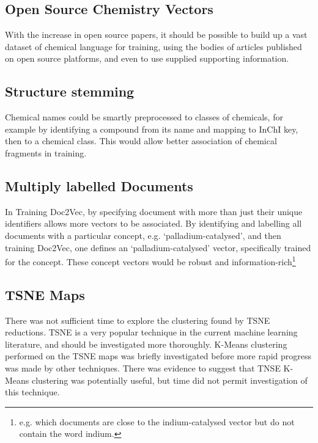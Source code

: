 \subsection{Open Source Chemistry Vectors}
With the increase in open source papers, it should be possible to build up a vast dataset of chemical language for training, using the bodies of articles published on open source platforms, and even to use supplied supporting information. 
\subsection{Structure stemming}
Chemical names could be smartly preprocessed to classes of chemicals, for example by identifying a compound from its name and mapping to InChI key, then to a chemical class. This would allow better association of chemical fragments in training.
\subsection{Multiply labelled Documents}
In Training Doc2Vec, by specifying document with more than just their unique identifiers allows more vectors to be associated. By identifying and labelling all documents with a particular concept, e.g. `palladium-catalysed', and then training Doc2Vec, one defines an `palladium-catalysed' vector, specifically trained for the concept. These concept vectors would be robust and information-rich\footnote{e.g. which documents are close to the indium-catalysed vector but do not contain the word indium.}
\subsection{TSNE Maps}
There was not sufficient time to explore the clustering found by TSNE reductions. TSNE is a very popular technique in the current machine learning literature, and should be investigated more thoroughly. K-Means clustering performed on the TSNE maps was briefly investigated before more rapid progress was made by other techniques. There was evidence to suggest that TNSE K-Means clustering was potentially useful, but time did not permit investigation of this technique.